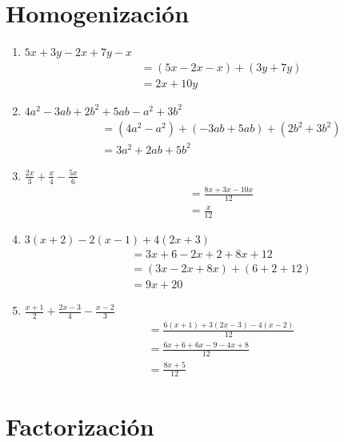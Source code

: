 \documentclass[12pt,a4paper]{article}
\begin{document}
\section{Homogenización}

\begin{enumerate}
    \item $5x + 3y - 2x + 7y - x$
    \begin{align*}
        &= (5x - 2x - x) + (3y + 7y)\\
        &= 2x + 10y
    \end{align*}
    
    \item $4a^2 - 3ab + 2b^2 + 5ab - a^2 + 3b^2$
    \begin{align*}
        &= (4a^2 - a^2) + (-3ab + 5ab) + (2b^2 + 3b^2)\\
        &= 3a^2 + 2ab + 5b^2
    \end{align*}
    
    \item $\frac{2x}{3} + \frac{x}{4} - \frac{5x}{6}$
    \begin{align*}
        &= \frac{8x + 3x - 10x}{12}\\
        &= \frac{x}{12}
    \end{align*}
    
    \item $3(x + 2) - 2(x - 1) + 4(2x + 3)$
    \begin{align*}
        &= 3x + 6 - 2x + 2 + 8x + 12\\
        &= (3x - 2x + 8x) + (6 + 2 + 12)\\
        &= 9x + 20
    \end{align*}
    
    \item $\frac{x + 1}{2} + \frac{2x - 3}{4} - \frac{x - 2}{3}$
    \begin{align*}
        &= \frac{6(x + 1) + 3(2x - 3) - 4(x - 2)}{12}\\
        &= \frac{6x + 6 + 6x - 9 - 4x + 8}{12}\\
        &= \frac{8x + 5}{12}
    \end{align*}
\end{enumerate}

\section{Factorización}
\end{document}
